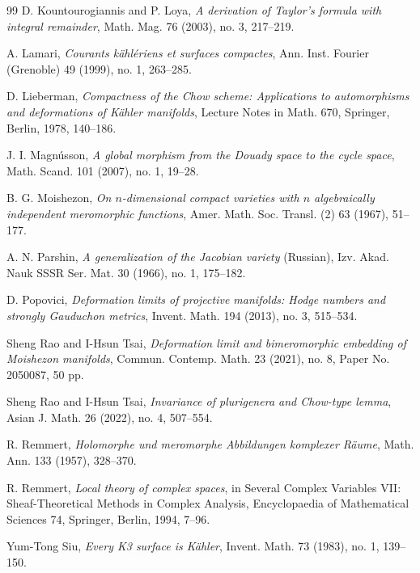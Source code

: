 \documentclass[11pt]{amsart}
\numberwithin{equation}{section}
\theoremstyle{plain}
\theoremstyle{definition}
\begin{document}
\begin{thebibliography}{99}
D. Kountourogiannis and P. Loya,
\textit{A derivation of Taylor's formula with integral remainder},
Math. Mag. 76 (2003), no. 3, 217--219.

A. Lamari,
\textit{Courants k\"ahl\'eriens et surfaces compactes},
Ann. Inst. Fourier (Grenoble) 49 (1999), no. 1, 263--285.

D. Lieberman,
\textit{Compactness of the Chow scheme: Applications to automorphisms
and deformations of K\"ahler manifolds},
Lecture Notes in Math. 670, Springer, Berlin, 1978, 140--186.

J. I. Magn\'usson,
\textit{A global morphism from the Douady space to the cycle space},
Math. Scand. 101 (2007), no. 1, 19--28.

B. G. Moishezon,
\textit{On $n$-dimensional compact varieties with $n$ algebraically
independent meromorphic functions},
Amer. Math. Soc. Transl. (2) 63 (1967), 51--177.


A. N. Parshin,
\textit{A generalization of the Jacobian variety} (Russian),
Izv. Akad. Nauk SSSR Ser. Mat. 30 (1966), no. 1, 175--182.

D. Popovici,
\textit{Deformation limits of projective manifolds: Hodge numbers and
strongly Gauduchon metrics},
Invent. Math. 194 (2013), no. 3, 515--534.

Sheng Rao and I-Hsun Tsai,
\textit{Deformation limit and bimeromorphic embedding of Moishezon
manifolds},
Commun. Contemp. Math. 23 (2021), no. 8, Paper No. 2050087, 50 pp.

Sheng Rao and I-Hsun Tsai,
\textit{Invariance of plurigenera and Chow-type lemma},
Asian J. Math. 26 (2022), no. 4, 507--554.

R. Remmert,
\textit{Holomorphe und meromorphe Abbildungen komplexer R\"aume},
Math. Ann. 133 (1957), 328--370.

R. Remmert,
\textit{Local theory of complex spaces},
in Several Complex Variables VII: Sheaf-Theoretical Methods in Complex
Analysis, Encyclopaedia of Mathematical Sciences 74,
Springer, Berlin, 1994, 7--96.

Yum-Tong Siu,
\textit{Every K3 surface is K\"ahler},
Invent. Math. 73 (1983), no. 1, 139--150.

\end{thebibliography}
\end{document}
